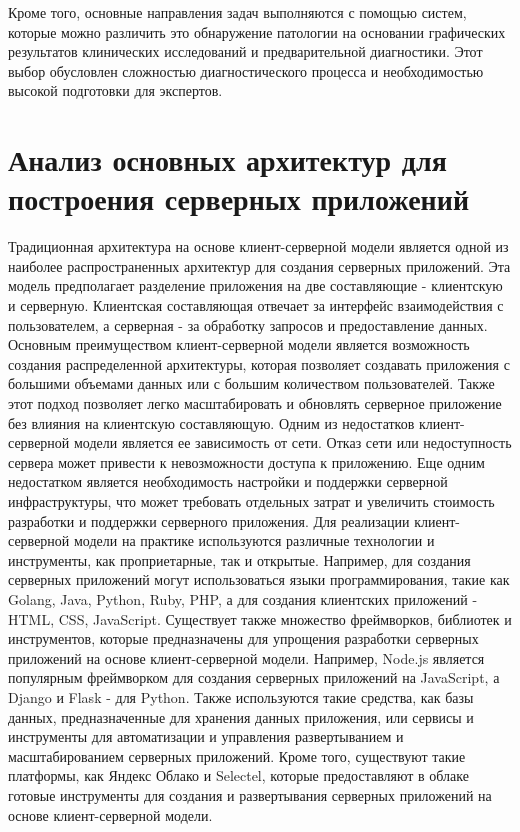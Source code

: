 Кроме того, основные направления задач выполняются с помощью систем, которые можно различить это обнаружение патологии на основании графических результатов клинических исследований и предварительной диагностики. Этот выбор обусловлен сложностью диагностического процесса и необходимостью высокой подготовки для экспертов.\\


\section{Анализ основных архитектур для построения серверных приложений}

Традиционная архитектура на основе клиент-серверной модели является одной из наиболее распространенных архитектур для создания серверных приложений. Эта модель предполагает разделение приложения на две составляющие - клиентскую и серверную. Клиентская составляющая отвечает за интерфейс взаимодействия с пользователем, а серверная - за обработку запросов и предоставление данных.
Основным преимуществом клиент-серверной модели является возможность создания распределенной архитектуры, которая позволяет создавать приложения с большими объемами данных или с большим количеством пользователей. Также этот подход позволяет легко масштабировать и обновлять серверное приложение без влияния на клиентскую составляющую.
Одним из недостатков клиент-серверной модели является ее зависимость от сети. Отказ сети или недоступность сервера может привести к невозможности доступа к приложению. Еще одним недостатком является необходимость настройки и поддержки серверной инфраструктуры, что может требовать отдельных затрат и увеличить стоимость разработки и поддержки серверного приложения.
Для реализации клиент-серверной модели на практике используются различные технологии и инструменты, как проприетарные, так и открытые. Например, для создания серверных приложений могут использоваться языки программирования, такие как Golang, Java, Python, Ruby, PHP, а для создания клиентских приложений - HTML, CSS, JavaScript.
Существует также множество фреймворков, библиотек и инструментов, которые предназначены для упрощения разработки серверных приложений на основе клиент-серверной модели. Например, Node.js является популярным фреймворком для создания серверных приложений на JavaScript, а Django и Flask - для Python.
Также используются такие средства, как базы данных, предназначенные для хранения данных приложения, или сервисы и инструменты для автоматизации и управления развертыванием и масштабированием серверных приложений. Кроме того, существуют такие платформы, как Яндекс Облако и Selectel, которые предоставляют в облаке готовые инструменты для создания и развертывания серверных приложений на основе клиент-серверной модели.

